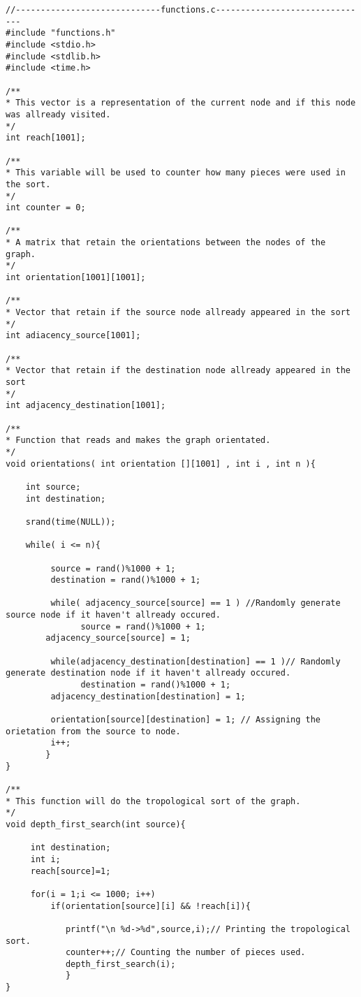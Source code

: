 \documentclass[14pt]{article}
\begin{document}
\begin{lstlisting}
//-----------------------------functions.c-------------------------------
#include "functions.h"
#include <stdio.h>
#include <stdlib.h>
#include <time.h>

/**
* This vector is a representation of the current node and if this node was allready visited.
*/
int reach[1001];

/**
* This variable will be used to counter how many pieces were used in the sort.
*/
int counter = 0;

/**
* A matrix that retain the orientations between the nodes of the graph.
*/
int orientation[1001][1001];

/**
* Vector that retain if the source node allready appeared in the sort
*/
int adiacency_source[1001];

/**
* Vector that retain if the destination node allready appeared in the sort
*/
int adjacency_destination[1001];

/**
* Function that reads and makes the graph orientated.
*/
void orientations( int orientation [][1001] , int i , int n ){

    int source;
    int destination;

    srand(time(NULL));

    while( i <= n){

         source = rand()%1000 + 1;
         destination = rand()%1000 + 1;

         while( adjacency_source[source] == 1 ) //Randomly generate source node if it haven't allready occured.
               source = rand()%1000 + 1;
        adjacency_source[source] = 1;

         while(adjacency_destination[destination] == 1 )// Randomly generate destination node if it haven't allready occured.
               destination = rand()%1000 + 1;
         adjacency_destination[destination] = 1;

         orientation[source][destination] = 1; // Assigning the orietation from the source to node.
         i++;
        }
}

/**
* This function will do the tropological sort of the graph.
*/
void depth_first_search(int source){

     int destination;
     int i;
     reach[source]=1;

     for(i = 1;i <= 1000; i++)
         if(orientation[source][i] && !reach[i]){

            printf("\n %d->%d",source,i);// Printing the tropological sort.
            counter++;// Counting the number of pieces used.
            depth_first_search(i);
            }
}


\end{lstlisting}
\end{document}
